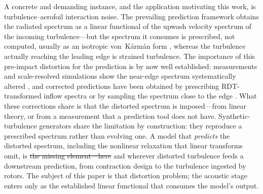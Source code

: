 \documentclass[lineno]{JFM-FLM_Au}
\providecommand{\DIFadd}[1]{{\protect\color{blue}\uwave{#1}}} %
\providecommand{\DIFdel}[1]{{\protect\color{red}\sout{#1}}} %
\providecommand{\DIFaddbegin}{} %
\providecommand{\DIFaddend}{} %
\providecommand{\DIFdelbegin}{} %
\providecommand{\DIFdelend}{} %
\begin{document}
A concrete and demanding instance, and the application motivating this
work, is turbulence--aerofoil interaction noise. The prevailing
prediction framework \citep{Amiet1975,PatersonAmiet1977,RogerMoreau2010}
obtains the radiated spectrum as a linear functional of the upwash
velocity spectrum of the incoming turbulence---but the spectrum it
consumes is prescribed, not computed, usually as an isotropic
von~K\'arm\'an form \citep{vonKarman1948}, whereas the turbulence
actually reaching the leading edge is strained turbulence. The
importance of this pre-impact distortion for the prediction is by now
well established: measurements and scale-resolved simulations show the
near-edge spectrum systematically altered
\citep{dosSantos2023,Ribeiro2023,Piccolo2024}, and corrected predictions
have been obtained by prescribing RDT-transformed inflow spectra
\citep{deSantana2016,dosSantos2023} or by sampling the spectrum close to
the edge \citep{Piccolo2024}. What these corrections share is that the
distorted spectrum is imposed---from linear theory, or from a
measurement that a prediction tool does not have. Synthetic-turbulence
generators \citep{KimHaeri2015} share the limitation by construction:
they reproduce a prescribed spectrum rather than evolving one. A model
that \emph{predicts} the distorted spectrum, including the nonlinear
relaxation that linear transforms omit, is \DIFdelbegin \DIFdel{the missing element---here
}\DIFdelend \DIFaddbegin \DIFadd{absent from current practice---here }\DIFaddend and wherever distorted turbulence feeds a downstream prediction, from
contraction design to the turbulence ingested by rotors. The subject
of this paper is that distortion problem; the acoustic stage enters
only as the established linear functional that consumes the model's
output.
\end{document}
